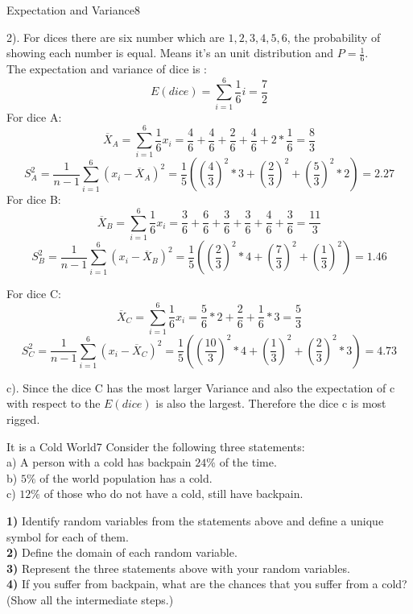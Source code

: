 \begin{questions}
\begin{question}{Expectation and Variance}{8}
\begin{answer}
2).
For dices there are six number which are $1,2,3,4,5,6$, the probability of showing each number is equal. Means it's an unit distribution and $P = \frac{1}{6}$. \\
The expectation and variance of dice is :
$$E(dice) = \sum_{i = 1}^6 \frac{1}{6 }i = \frac{7}{2}$$
For dice A:
$$\overline{ X}_{A} = \sum_{i=1}^6 \frac{1}{6}x_i = \frac{4}{6}+\frac{4}{6}+\frac{2}{6}+\frac{4}{6}+ 2* \frac{1}{6} = \frac{8}{3}$$
$$S_A^2 =\frac{1}{n-1}\sum_{i=1}^6 (x_i-\overline{X}_A)^2 = \frac{1}{5}((\frac{4}{3})^2*3+ (\frac{2}{3})^2+ (\frac{5}{3})^2*2 )= 2.27$$
For dice B:
$$\overline{ X}_{B} = \sum_{i=1}^6 \frac{1}{6}x_i = \frac{3}{6}+\frac{6}{6}+\frac{3}{6}+\frac{3}{6}+ \frac{4}{6} + \frac{3}{6} = \frac{11}{3}$$
$$S_B^2 =\frac{1}{n-1}\sum_{i=1}^6 (x_i-\overline{X}_B)^2 = \frac{1}{5}((\frac{2}{3})^2*4+ (\frac{7}{3})^2+ (\frac{1}{3})^2) = 1.46$$

For dice C:
$$\overline{ X}_{C} = \sum_{i=1}^6 \frac{1}{6}x_i = \frac{5}{6}*2+\frac{2}{6}+\frac{1}{6}*3 = \frac{5}{3}$$
$$S_C^2 =\frac{1}{n-1}\sum_{i=1}^6 (x_i-\overline{X}_C)^2 = \frac{1}{5}((\frac{10}{3})^2*4+ (\frac{1}{3})^2+ (\frac{2}{3})^2*3) = 4.73$$

c).
Since the dice C has the most larger Variance and also the expectation of c with respect to the $E(dice)$ is also the largest. Therefore the dice c is most rigged.


\end{answer}

\end{question}
\newpage

\begin{question}{It is a Cold World}{7}
Consider the following three statements:
\\
a) A person with a cold has backpain $24\%$ of the time.
\\
b) $5\%$ of the world population has a cold.
\\
c) $12\%$ of those who do not have a cold, still have backpain.

\textbf{1)} Identify random variables from the statements above and define a unique symbol for each of them.\\
\textbf{2)} Define the domain of each random variable.\\
\textbf{3)} Represent the three statements above with your random variables.\\
\textbf{4)} If you suffer from backpain, what are the chances that you suffer from a cold? (Show all the intermediate steps.)


\end{question}
\end{questions}

